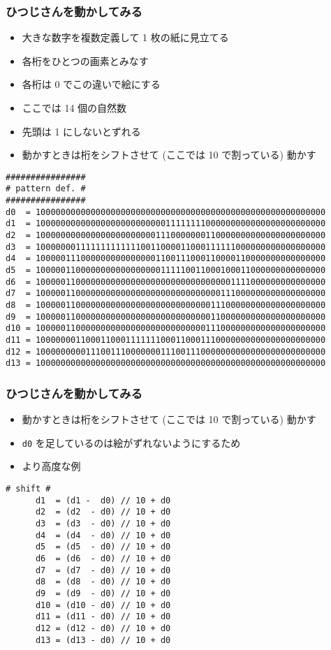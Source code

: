 \begin{frame}
\frametitle{ひつじさんを動かしてみる}
  \begin{itemize}
\scriptsize
\item 大きな数字を複数定義して 1 枚の紙に見立てる
\item 各桁をひとつの画素とみなす
\item 各桁は 0 でこの違いで絵にする
\item ここでは 14 個の自然数
\item 先頭は 1 にしないとずれる
\item 動かすときは桁をシフトさせて (ここでは 10 で割っている) 動かす
  \end{itemize}
  \begin{lstlisting}[caption={sheep.py (declaration)},label=sheep-data]
################
# pattern def. #
################
d0  = 1000000000000000000000000000000000000000000000000000000000
d1  = 1000000000000000000000000011111111000000000000000000000000
d2  = 1000000000000000000000001110000000110000000000000000000000
d3  = 1000000011111111111110011000011000111111000000000000000000
d4  = 1000001110000000000000001100111000110000110000000000000000
d5  = 1000001100000000000000000111110011000100011000000000000000
d6  = 1000001100000000000000000000000000000001111000000000000000
d7  = 1000001100000000000000000000000000000111000000000000000000
d8  = 1000001100000000000000000000000000011100000000000000000000
d9  = 1000001100000000000000000000000000011000000000000000000000
d10 = 1000001100000000000000000000000000111000000000000000000000
d11 = 1000000011000110001111111000110001110000000000000000000000
d12 = 1000000000111001110000000111001110000000000000000000000000
d13 = 1000000000000000000000000000000000000000000000000000000000
  \end{lstlisting}
\end{frame}
\begin{frame}
\frametitle{ひつじさんを動かしてみる}
  \begin{itemize}
\scriptsize
\item 動かすときは桁をシフトさせて (ここでは 10 で割っている) 動かす
\item {\tt d0} を足しているのは絵がずれないようにするため
\item より高度な例 \href{https://www.a1k0n.net/2011/07/20/donut-math.html}{}
  \end{itemize}
  \begin{lstlisting}[caption={sheep.py (shift)},label=sheep-shift,firstnumber=last]
      # shift #
      d1  = (d1 -  d0) // 10 + d0
      d2  = (d2  - d0) // 10 + d0
      d3  = (d3  - d0) // 10 + d0
      d4  = (d4  - d0) // 10 + d0
      d5  = (d5  - d0) // 10 + d0
      d6  = (d6  - d0) // 10 + d0
      d7  = (d7  - d0) // 10 + d0
      d8  = (d8  - d0) // 10 + d0
      d9  = (d9  - d0) // 10 + d0
      d10 = (d10 - d0) // 10 + d0
      d11 = (d11 - d0) // 10 + d0
      d12 = (d12 - d0) // 10 + d0
      d13 = (d13 - d0) // 10 + d0
  \end{lstlisting}
\end{frame}
